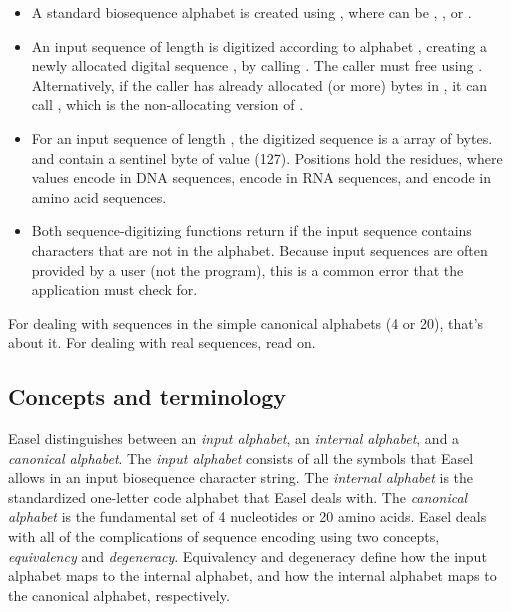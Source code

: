 \begin{itemize}
\item A standard biosequence alphabet is created using
, where  can be
, , or .

\item An input sequence  of length  is digitized
according to alphabet , creating a newly allocated digital
sequence , by calling . The caller must free  using .
Alternatively, if the caller has already allocated  (or
more) bytes in , it can call , which is the non-allocating version of
.

\item For an input sequence of length , the digitized
sequence  is a  array of 
bytes.  and  contain a sentinel byte of
value  (127).  Positions  hold the
residues, where values  encode  in DNA
sequences,  encode  in RNA sequences, and
 encode  in amino acid sequences.

\item Both sequence-digitizing functions return  if
the input sequence contains characters that are not in the
alphabet. Because input sequences are often provided by a user (not
the program), this is a common error that the application must check
for.
\end{itemize}

For dealing with sequences in the simple canonical alphabets (4 or
20), that's about it. For dealing with real sequences, read on.


\subsection{Concepts and terminology}

Easel distinguishes between an \emph{input alphabet}, an
\emph{internal alphabet}, and a \emph{canonical alphabet}.  The
\emph{input alphabet} consists of all the symbols that Easel allows in
an input biosequence character string. The \emph{internal alphabet} is
the standardized one-letter code alphabet that Easel deals with. The
\emph{canonical alphabet} is the fundamental set of 4 nucleotides or
20 amino acids. Easel deals with all of the complications of sequence
encoding using two concepts, \emph{equivalency} and \emph{degeneracy}.
Equivalency and degeneracy define how the input alphabet maps to the
internal alphabet, and how the internal alphabet maps to the canonical
alphabet, respectively.

